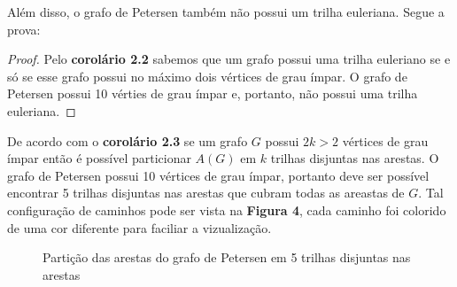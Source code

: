 \documentclass[11pt,a4paper]{exam}
\begin{document}
Além disso, o grafo de Petersen também não possui um trilha euleriana.
Segue a prova:
\begin{proof}
    Pelo \textbf{corolário 2.2} sabemos que um grafo possui uma trilha
    euleriano se e só se esse grafo possui no máximo dois vértices de
    grau ímpar. O grafo de Petersen possui 10 vérties de grau ímpar e,
    portanto, não possui uma trilha euleriana.
\end{proof}

De acordo com o \textbf{corolário 2.3} se um grafo $G$ possui $2k>2$
vértices de grau ímpar então é possível particionar $A(G)$ em $k$
trilhas disjuntas nas arestas. O grafo de Petersen possui 10 vértices de
grau ímpar, portanto deve ser possível encontrar 5 trilhas disjuntas nas
arestas que cubram todas as areastas de $G$. Tal configuração de
caminhos pode ser vista na \textbf{Figura 4}, cada caminho foi colorido de
uma cor diferente para faciliar a vizualização.
\begin{figure}[H]
    \centering
    \caption{Partição das arestas do grafo de Petersen em 5 trilhas
    disjuntas nas arestas}
\end{figure}
    
\end{document}
